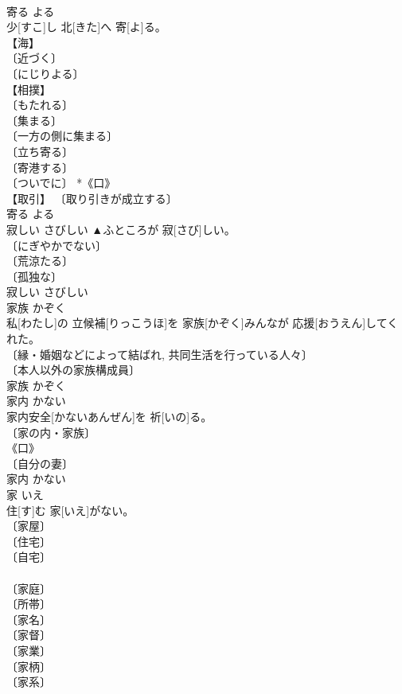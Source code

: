 \documentclass[8pt]{extreport}
\begin{document}
\begin{CJK}{UTF8}{min}
\\	寄る	よる	
\\	少[すこ]し 北[きた]へ 寄[よ]る。	
\\	【海】 
\\	〔近づく〕 
\\	〔にじりよる〕 
\\	【相撲】 
\\	〔もたれる〕 
\\	〔集まる〕 
\\	〔一方の側に集まる〕 
\\	〔立ち寄る〕 
\\	〔寄港する〕 
\\	〔ついでに〕 *《口》 
\\	【取引】 〔取り引きが成立する〕 
\\	寄る	よる	
\\	寂しい	さびしい	▲ふところが 寂[さび]しい。	
\\	〔にぎやかでない〕 
\\	〔荒涼たる〕 
\\	〔孤独な〕 
\\	寂しい	さびしい	
\\	家族	かぞく	
\\	私[わたし]の 立候補[りっこうほ]を 家族[かぞく]みんなが 応援[おうえん]してくれた。	
\\	〔縁・婚姻などによって結ばれ, 共同生活を行っている人々〕 
\\	〔本人以外の家族構成員〕 
\\	家族	かぞく	
\\	家内	かない	
\\	家内安全[かないあんぜん]を 祈[いの]る。	
\\	〔家の内・家族〕 
\\	《口》 
\\	〔自分の妻〕 
\\	家内	かない	
\\	家	いえ	
\\	住[す]む 家[いえ]がない。	
\\	〔家屋〕 
\\	〔住宅〕 
\\	〔自宅〕 
\\	[⇒うち２] 
\\	〔家庭〕 
\\	〔所帯〕 
\\	〔家名〕 
\\	〔家督〕 
\\	〔家業〕 
\\	〔家柄〕 
\\	〔家系〕 

\end{CJK}
\end{document}
